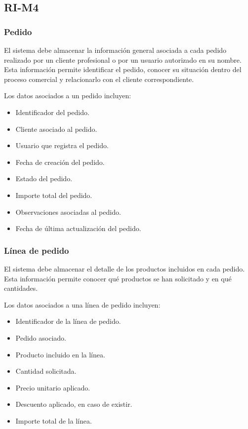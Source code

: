 \subsection{RI-M4}

\subsubsection*{Pedido}

El sistema debe almacenar la información general asociada a cada pedido realizado por un cliente profesional o por un usuario autorizado en su nombre. Esta información permite identificar el pedido, conocer su situación dentro del proceso comercial y relacionarlo con el cliente correspondiente.

Los datos asociados a un pedido incluyen:

\begin{itemize}
    \item Identificador del pedido.
    \item Cliente asociado al pedido.
    \item Usuario que registra el pedido.
    \item Fecha de creación del pedido.
    \item Estado del pedido.
    \item Importe total del pedido.
    \item Observaciones asociadas al pedido.
    \item Fecha de última actualización del pedido.
\end{itemize}

\subsubsection*{Línea de pedido}

El sistema debe almacenar el detalle de los productos incluidos en cada pedido. Esta información permite conocer qué productos se han solicitado y en qué cantidades.

Los datos asociados a una línea de pedido incluyen:

\begin{itemize}
    \item Identificador de la línea de pedido.
    \item Pedido asociado.
    \item Producto incluido en la línea.
    \item Cantidad solicitada.
    \item Precio unitario aplicado.
    \item Descuento aplicado, en caso de existir.
    \item Importe total de la línea.
\end{itemize}

